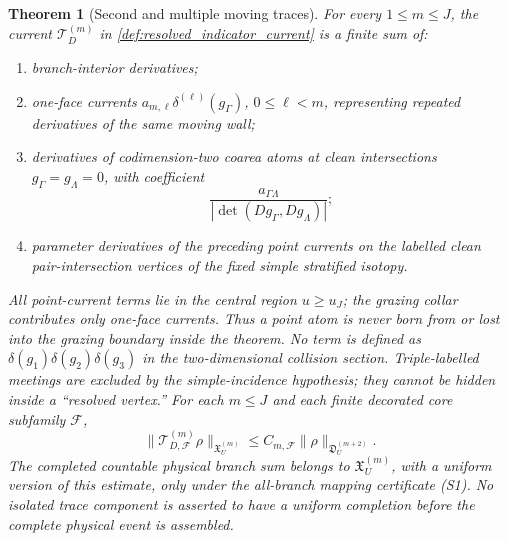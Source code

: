 \documentclass[11pt]{amsart}
\theoremstyle{compactplain}
\newtheorem{theorem}{Theorem}[section]
\theoremstyle{compactdefinition}
\theoremstyle{compactremark}
\begin{document}
\begin{theorem}[Second and multiple moving traces]
\label{thm:second_multiple_trace}
For every \(1\le m\le J\), the current
\(\mathcal T_D^{(m)}\) in
\cref{def:resolved_indicator_current} is a finite sum of:
\begin{enumerate}[label=\textup{(\roman*)},wide,labelindent=0pt]
  \item branch-interior derivatives;
  \item one-face currents
  \(a_{m,\ell}\delta^{(\ell)}(g_\Gamma)\), \(0\le\ell<m\), representing
  repeated derivatives of the same moving wall;
  \item derivatives of codimension-two coarea atoms at clean intersections
  \(g_\Gamma=g_\Lambda=0\), with coefficient
  \[
    \frac{a_{\Gamma\Lambda}}
    {|\det(Dg_\Gamma,Dg_\Lambda)|};
  \]
  \item parameter derivatives of the preceding point currents on the labelled
  clean pair-intersection vertices of the fixed simple stratified isotopy.
\end{enumerate}
All point-current terms lie in the central region \(u\ge u_J\); the grazing
collar contributes only one-face currents.  Thus a point atom is never born
from or lost into the grazing boundary inside the theorem.
No term is defined as
\(\delta(g_1)\delta(g_2)\delta(g_3)\) in the two-dimensional collision
section.  Triple-labelled meetings are excluded by the simple-incidence
hypothesis; they cannot be hidden inside a ``resolved vertex.''  For each
\(m\le J\) and each finite decorated core subfamily \(\mathscr F\),
\begin{equation}
\label{eq:higher_trace_scale_bound}
  \|\mathcal T_{D,\mathscr F}^{(m)}\rho\|_{\mathfrak X_U^{(m)}}
  \le C_{m,\mathscr F}\|\rho\|_{\mathfrak D_U^{(m+2)}} .
\end{equation}
The completed countable physical branch sum belongs to
\(\mathfrak X_U^{(m)}\), with a uniform version of this estimate, only under
the all-branch mapping certificate (S1).  No isolated trace component is
asserted to have a uniform completion before the complete physical event is
assembled.
\end{theorem}
\end{document}
